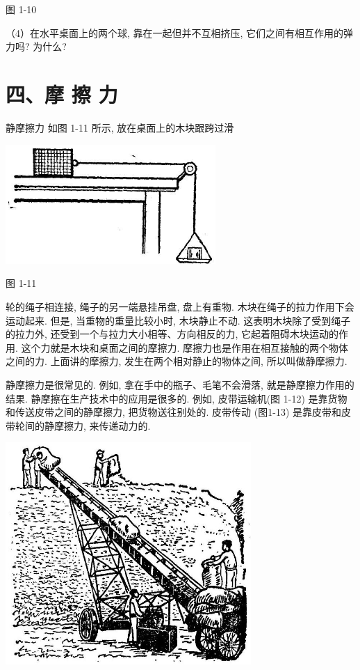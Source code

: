 \documentclass[10pt]{article}
\begin{document}
图 1-10

（4）在水平桌面上的两个球, 靠在一起但并不互相挤压, 它们之间有相互作用的弹力吗? 为什么?

\section*{四、摩 擦 力}

静摩擦力 如图 1-11 所示, 放在桌面上的木块跟跨过滑

\begin{center}
\includegraphics[max width=0.6\textwidth]{images/01912d55-147c-70aa-b0e0-1782a122f948_24_859189.jpg}
\end{center}

图 1-11

轮的绳子相连接, 绳子的另一端悬挂吊盘, 盘上有重物. 木块在绳子的拉力作用下会运动起来. 但是, 当重物的重量比较小时, 木块静止不动. 这表明木块除了受到绳子的拉力外, 还受到一个与拉力大小相等、方向相反的力, 它起着阻碍木块运动的作用. 这个力就是木块和桌面之间的摩擦力. 摩擦力也是作用在相互接触的两个物体之间的力. 上面讲的摩擦力, 发生在两个相对静止的物体之间, 所以叫做静摩擦力.

静摩擦力是很常见的. 例如, 拿在手中的瓶子、毛笔不会滑落, 就是静摩擦力作用的结果. 静摩擦在生产技术中的应用是很多的. 例如, 皮带运输机(图 1-12) 是靠货物和传送皮带之间的静摩擦力, 把货物送往别处的. 皮带传动 (图1-13) 是靠皮带和皮带轮间的静摩擦力, 来传递动力的.

\begin{center}
\includegraphics[max width=0.7\textwidth]{images/01912d55-147c-70aa-b0e0-1782a122f948_25_316673.jpg}
\end{center}
\end{document}
